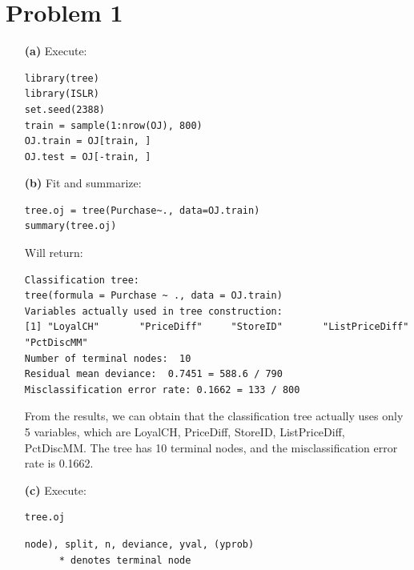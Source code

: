 \documentclass[twoside,11pt]{homework}
\begin{document}
\maketitle

\section*{Problem 1}

\begin{enumerate}
\item[\textbf{(a)}] Execute:

\begin{lstlisting}
library(tree)
library(ISLR)
set.seed(2388)
train = sample(1:nrow(OJ), 800)
OJ.train = OJ[train, ]
OJ.test = OJ[-train, ]
\end{lstlisting}

\item[\textbf{(b)}] Fit and summarize:

\begin{lstlisting}
tree.oj = tree(Purchase~., data=OJ.train)
summary(tree.oj)
\end{lstlisting}

Will return:

\begin{verbatim}
Classification tree:
tree(formula = Purchase ~ ., data = OJ.train)
Variables actually used in tree construction:
[1] "LoyalCH"       "PriceDiff"     "StoreID"       "ListPriceDiff" "PctDiscMM"    
Number of terminal nodes:  10 
Residual mean deviance:  0.7451 = 588.6 / 790 
Misclassification error rate: 0.1662 = 133 / 800

\end{verbatim}

From the results, we can obtain that the classification tree actually uses only 5 variables, which are LoyalCH, PriceDiff, StoreID, ListPriceDiff, PctDiscMM. The tree has 10 terminal nodes, and the misclassification error rate is 0.1662.

\item[\textbf{(c)}] Execute:

\begin{lstlisting}
tree.oj
\end{lstlisting}

\begin{verbatim}
node), split, n, deviance, yval, (yprob)
      * denotes terminal node


\end{verbatim}
\end{enumerate}
\end{document}
